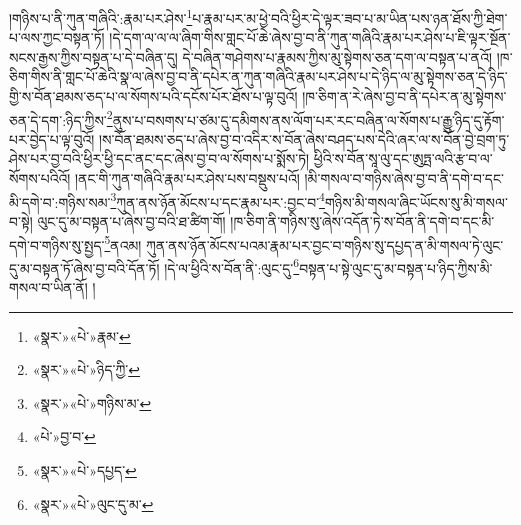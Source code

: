 །གཉིས་པ་ནི་ཀུན་གཞིའི་:རྣམ་པར་ཤེས་\footnote{«སྣར་»«པེ་»རྣམ་}པ་རྣམ་པར་མ་ཕྱེ་བའི་ཕྱིར་དེ་ལྟར་ཟབ་པ་མ་ཡིན་པས་ཉན་ཐོས་ཀྱི་ཐེག་པ་ལས་ཀྱང་བསྟན་ཏོ། །དེ་དག་ལ་ལ་ལ་ཞིག་གིས་གླང་པོ་ཆེ་ཞེས་བྱ་བ་ནི་ཀུན་གཞིའི་རྣམ་པར་ཤེས་པ་ཇི་ལྟར་སྔོན་སངས་རྒྱས་ཀྱིས་བསྟན་པ་དེ་བཞིན་དུ། དེ་བཞིན་གཤེགས་པ་རྣམས་ཀྱིས་མུ་སྟེགས་ཅན་དག་ལ་བསྟན་པ་ནའོ། །ཁ་ཅིག་གིས་ནི་གླང་པོ་ཆེའི་སྣ་ལ་ཞེས་བྱ་བ་ནི་དཔེར་ན་ཀུན་གཞིའི་རྣམ་པར་ཤེས་པ་དེ་ཉིད་ལ་མུ་སྟེགས་ཅན་དེ་ཉིད་གྱི་ས་བོན་ཐམས་ཅད་པ་ལ་སོགས་པའི་དངོས་པོར་ཐོས་པ་ལྟ་བུའོ། །ཁ་ཅིག་ན་རེ་ཞེས་བྱ་བ་ནི་དཔེར་ན་མུ་སྟེགས་ཅན་དེ་དག་:ཉིད་ཀྱིས་\footnote{«སྣར་»«པེ་»ཉིད་ཀྱི་}ནུས་པ་བསགས་པ་ཙམ་དུ་དམིགས་ནས་ལོག་པར་རང་བཞིན་ལ་སོགས་པ་རྒྱུ་ཉིད་དུ་རྟོག་པར་བྱེད་པ་ལྟ་བུའོ། །ས་བོན་ཐམས་ཅད་པ་ཞེས་བྱ་བ་འདིར་ས་བོན་ཞེས་བཤད་པས་དེའི་ཞར་ལ་ས་བོན་བྱེ་བྲག་ཏུ་ཤེས་པར་བྱ་བའི་ཕྱིར་ཕྱི་དང་ནང་དང་ཞེས་བྱ་བ་ལ་སོགས་པ་སྨོས་ཏེ། ཕྱིའི་ས་བོན་སཱ་ལུ་དང་ཨུཏྤ་ལའི་རྩ་བ་ལ་སོགས་པའིའོ། །ནང་གི་ཀུན་གཞིའི་རྣམ་པར་ཤེས་པས་བསྡུས་པའོ། །མི་གསལ་བ་གཉིས་ཞེས་བྱ་བ་ནི་དགེ་བ་དང་མི་དགེ་བ་:གཉིས་སམ་\footnote{«སྣར་»«པེ་»གཉིས་མ་}ཀུན་ནས་ཉོན་མོངས་པ་དང་རྣམ་པར་:བྱང་བ་\footnote{«པེ་»བྱ་བ་}གཉིས་མི་གསལ་ཞིང་ཡོངས་སུ་མི་གསལ་བ་སྟེ། ལུང་དུ་མ་བསྟན་པ་ཞེས་བྱ་བའི་ཐ་ཚིག་གོ། །ཁ་ཅིག་ནི་གཉིས་སུ་ཞེས་འདོན་ཏེ་ས་བོན་ནི་དགེ་བ་དང་མི་དགེ་བ་གཉིས་སུ་སྤྱད་\footnote{«སྣར་»«པེ་»དཔྱད་}ནའམ། ཀུན་ནས་ཉོན་མོངས་པའམ་རྣམ་པར་བྱང་བ་གཉིས་སུ་དཔྱད་ན་མི་གསལ་ཏེ་ལུང་དུ་མ་བསྟན་ཏོ་ཞེས་བྱ་བའི་དོན་ཏོ། །དེ་ལ་ཕྱིའི་ས་བོན་ནི་:ལུང་དུ་\footnote{«སྣར་»«པེ་»ལུང་དུ་མ་}བསྟན་པ་སྟེ་ལུང་དུ་མ་བསྟན་པ་ཉིད་ཀྱིས་མི་གསལ་བ་ཡིན་ནོ། །
